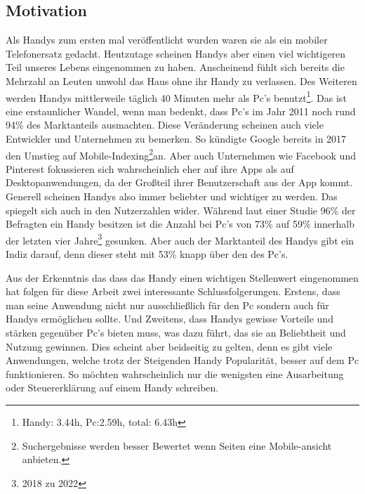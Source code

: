 \subsection{Motivation}\label{subsection:motivation} \myCheckmark

Als Handys zum ersten mal veröffentlicht wurden waren sie als ein mobiler Telefonersatz gedacht. Heutzutage scheinen Handys aber einen viel wichtigeren Teil unseres Lebens eingenommen zu haben. Anscheinend fühlt sich bereits die Mehrzahl an Leuten unwohl das Haus ohne ihr Handy zu verlassen\cite{pcVsphone_feelingUneasyWhenLeavingPhoneHome}. Des Weiteren werden Handys mittlerweile täglich 40 Minuten mehr als Pc's benutzt\cite{pcVsphone_phoneScreenTime,pcVsphone_totalScreenTime,pcVsphone_totalScreenTime2}\footnote{Handy: 3.44h, Pc:2.59h, total: 6.43h}. Das ist eine erstaunlicher Wandel, wenn man bedenkt, dass Pc's im Jahr 2011 noch rund 94\% des Marktanteils ausmachten\cite{pcVsphone_smartphoneWebTrafficHigherThanPc}. Diese Veränderung scheinen auch viele Entwickler und Unternehmen zu bemerken. So kündigte Google bereits in 2017 den Umstieg auf Mobile-Indexing\footnote{Suchergebnisse werden besser Bewertet wenn Seiten eine Mobile-ansicht anbieten.}an\cite{pcVsphone_mobileFirstIndexing}. Aber auch Unternehmen wie Facebook und Pinterest fokussieren sich wahrscheinlich eher auf ihre Apps als auf Desktopanwendungen, da der Großteil ihrer Benutzerschaft aus der App kommt\cite{pcVsphone_socialMediaFacebookMobileUsage,pcVsphone_socialMediaPinterestMobileUsage}.\newline%
Generell scheinen Handys also immer beliebter und wichtiger zu werden. Das spiegelt sich auch in den Nutzerzahlen wider. Während laut einer Studie 96\% der Befragten ein Handy besitzen ist die Anzahl bei Pc's von 73\% auf 59\% innerhalb der letzten vier Jahre\footnote{2018 zu 2022} gesunken\cite{pcVsphone_deviceOwnership}. Aber auch der Marktanteil des Handys gibt ein Indiz darauf, denn dieser steht mit 53\% knapp über den des Pc's\cite{pcVsphone_smartphoneWebTrafficHigherThanPc}.%

\myNewSection%
Aus der Erkenntnis das dass das Handy einen wichtigen Stellenwert eingenommen hat folgen für diese Arbeit zwei interessante Schlussfolgerungen.\newline
Erstens, dass man seine Anwendung nicht nur ausschließlich für den Pc sondern auch für Handys ermöglichen sollte.\newline%
Und Zweitens, dass Handys gewisse Vorteile und stärken gegenüber Pc's bieten muss, was dazu führt, das sie an Beliebtheit und Nutzung gewinnen. Dies scheint aber beidseitig zu gelten, denn es gibt viele Anwendungen, welche trotz der Steigenden Handy Popularität, besser auf dem Pc funktionieren. So möchten wahrscheinlich nur die wenigsten eine Ausarbeitung oder Steuererklärung auf einem Handy schreiben.%

